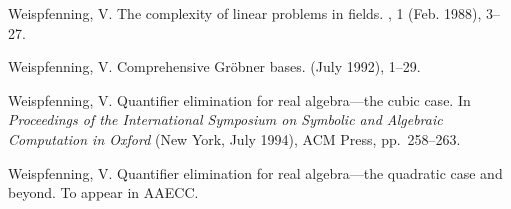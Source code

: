 \begin{thebibliography}{10}
{Weispfenning, V.}
\newblock The complexity of linear problems in fields.
, 1 (Feb. 1988), 3--27.

{Weispfenning, V.}
\newblock Comprehensive {G}r\"obner bases.
 (July 1992), 1--29.

{Weispfenning, V.}
\newblock Quantifier elimination for real algebra---the cubic case.
\newblock In {\em Proceedings of the International Symposium on Symbolic and
  Algebraic Computation in Oxford\/} (New York, July 1994), ACM Press,
  pp.~258--263.

{Weispfenning, V.}
\newblock Quantifier elimination for real algebra---the quadratic case and
  beyond.
\newblock To appear in AAECC.

\end{thebibliography}
